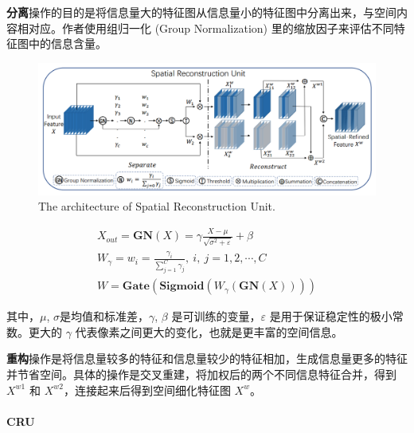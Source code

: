 \documentclass[a4paper, 10pt]{article}
\begin{document}
		\textbf{分离}操作的目的是将信息量大的特征图从信息量小的特征图中分离出来，与空间内容相对应。作者使用组归一化 (Group Normalization) 里的缩放因子来评估不同特征图中的信息含量。
		
		\begin{figure}[htbp]
			\centering 
			\includegraphics[width=\columnwidth]{picture/LLIE/SCConv/Spatial Reconstruction Unit}
			\caption{
				\label{fig: Spatial Reconstruction Unit} 
				The architecture of Spatial Reconstruction Unit.
			}
		\end{figure}
		
		\begin{equation}
			\begin{aligned}
				X_{out} = \textbf{GN}(X) = \gamma \frac{X-\mu}{\sqrt{\sigma^2 + \varepsilon}} + \beta \\
				W_{\gamma} = {w_i} = \frac{\gamma_i}{\sum_{j=1}^{C} \gamma_j}, \ i,\ j = 1, 2, \cdots, C \\
				W = \textbf{Gate}(\textbf{Sigmoid}(W_{\gamma}(\textbf{GN}(X))))				
			\end{aligned}
			\label{eq: SRU}
		\end{equation}
		
		其中，$\mu$, $\sigma$是均值和标准差，$\gamma$, $\beta$ 是可训练的变量，$\varepsilon$ 是用于保证稳定性的极小常数。更大的 $\gamma$ 代表像素之间更大的变化，也就是更丰富的空间信息。
		
		\textbf{重构}操作是将信息量较多的特征和信息量较少的特征相加，生成信息量更多的特征并节省空间。具体的操作是交叉重建，将加权后的两个不同信息特征合并，得到 $X^{w1}$ 和 $X^{w2}$，连接起来后得到空间细化特征图 $X^{w}$。
		
		
		
		\paragraph{CRU}
		
\end{document}
